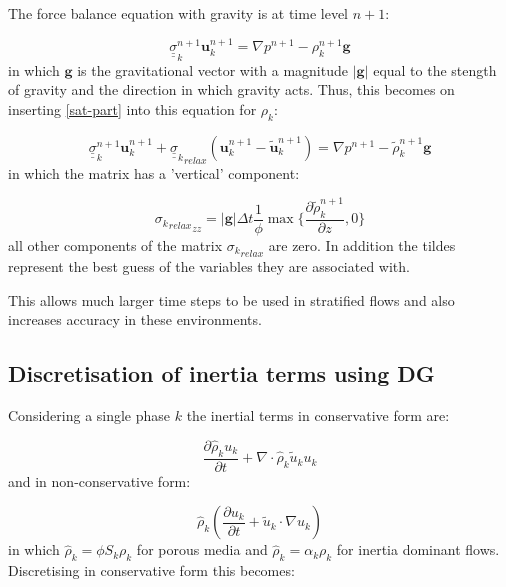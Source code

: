 The force balance equation with gravity is at time level $n+1$:

\begin{equation}
{\underline {\underline\sigma}}_k^{n+1} {\mathbf u}_k^{n+1} = \nabla p^{n+1} - \rho_k^{n+1} {\mathbf g}
\end{equation}
in which ${\mathbf g}$ is the gravitational vector with a
magnitude $\vert{\mathbf g}\vert$
equal to the stength of gravity and the direction in which gravity acts.
Thus, this becomes on inserting \ref{sat-part} into this equation
for $\rho_k$:


\begin{equation}
{\underline {\underline\sigma}}_k^{n+1} {\mathbf u}_k^{n+1}
+  {{\underline {\underline\sigma}}_k}_{relax}
({\mathbf u}_k^{n+1} - {\tilde {\mathbf u}}_k^{n+1})
= \nabla p^{n+1}
-
{\tilde \rho}_k^{n+1} {\mathbf g}
\end{equation}
in which the matrix has a 'vertical' component:

\begin{equation}
{{\sigma_k}_{relax}}_{zz} = \vert{\mathbf g}\vert  \Delta t
\frac{1}{ \phi }
\max\{ \frac{\partial  {\tilde \rho}_k^{n+1}}{\partial z}, 0\}
\end{equation}
all other components of the matrix ${{\sigma_k}_{relax}}$ are zero.
In addition the tildes represent the best guess of
the variables they are associated with.

This allows much larger time steps to be used in stratified
flows and also increases accuracy in these environments.



\subsection{Discretisation of inertia terms using DG}
Considering a single phase $k$ the inertial
terms in conservative form are:

\begin{equation}
\frac{\partial \hat\rho_k u_k}{\partial t}
+ \nabla \cdot \hat\rho_k \tilde u_k  u_k
\label{inertia-eqns-cons}
\end{equation}
and in non-conservative form:

\begin{equation}
\hat\rho_k \left(\frac{\partial u_k}{\partial t}
+  \tilde u_k\cdot \nabla u_k \right)
\label{inertia-eqns-non-cons}
\end{equation}
in which $\hat\rho_k= \phi S_k \rho_k$ for porous
media and $\hat\rho_k= \alpha_k \rho_k$ for inertia dominant
flows.
Discretising in conservative form this becomes:



